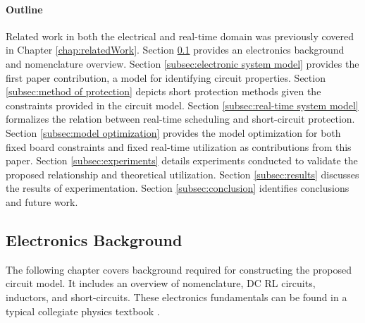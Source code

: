 \paragraph{Outline}
Related work in both the electrical and real-time domain was previously covered in Chapter \ref{chap:relatedWork}.
Section \ref{subsec:electronics background} provides an electronics background and nomenclature overview.
Section \ref{subsec:electronic system model} provides the first paper contribution, a model for identifying circuit properties.
Section \ref{subsec:method of protection} depicts short protection methods given the constraints provided in the circuit model.
Section \ref{subsec:real-time system model} formalizes the relation between real-time scheduling and short-circuit protection.
Section \ref{subsec:model optimization} provides the model optimization for both fixed board constraints and fixed real-time utilization as contributions from this paper.
Section \ref{subsec:experiments} details experiments conducted to validate the proposed relationship and theoretical utilization.
Section \ref{subsec:results} discusses the results of experimentation.
Section \ref{subsec:conclusion} identifies conclusions and future work.



\clearpage \subsection{Electronics Background}\label{subsec:electronics background}
The following chapter covers background required for constructing the proposed circuit model. It includes an overview of nomenclature, DC RL circuits, inductors, and short-circuits. These electronics fundamentals can be found in a typical collegiate physics textbook \cite{young_sears_2012}.

